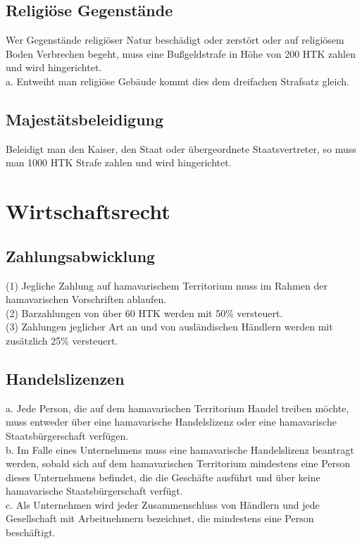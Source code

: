 \documentclass{article}
\begin{document}
\subsection{Religiöse Gegenstände}
Wer Gegenstände religiöser Natur beschädigt oder zerstört oder auf religiösem Boden Verbrechen begeht, muss eine Bußgeldstrafe in Höhe von 200 HTK zahlen und wird hingerichtet.\\
a. Entweiht man religiöse Gebäude kommt dies dem dreifachen Strafsatz gleich.

\subsection{Majestätsbeleidigung}
Beleidigt man den Kaiser, den Staat oder übergeordnete Staatsvertreter, so muss man 1000 HTK Strafe zahlen und wird hingerichtet.

\section{Wirtschaftsrecht}
\subsection{Zahlungsabwicklung}
(1) Jegliche Zahlung auf hamavarischem Territorium muss im Rahmen der hamavarischen Vorschriften ablaufen.\\
(2) Barzahlungen von über 60 HTK werden mit 50\% versteuert.\\
(3) Zahlungen jeglicher Art an und von ausländischen Händlern werden mit zusätzlich 25\% versteuert. 

\subsection{Handelslizenzen}\label{lizenzen}
a. Jede Person, die auf dem hamavarischen Territorium Handel treiben möchte, muss entweder über eine hamavarische Handelslizenz oder eine hamavarische Staatsbürgerschaft verfügen.\\
b. Im Falle eines Unternehmens muss eine hamavarische Handelslizenz beantragt werden, sobald sich auf dem hamavarischen Territorium mindestens eine Person dieses Unternehmens befindet, die die Geschäfte ausführt und über keine hamavarische Staatsbürgerschaft verfügt.\\
c. Als Unternehmen wird jeder Zusammenschluss von Händlern und jede Gesellschaft mit Arbeitnehmern bezeichnet, die mindestens eine Person beschäftigt.
\end{document}
